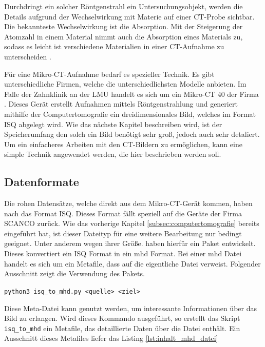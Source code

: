 Durchdringt ein solcher Röntgenstrahl ein Untersuchungsobjekt, werden die
Details aufgrund der Wechselwirkung mit Materie auf einer \ac{CT}-Probe sichtbar.
Die bekannteste Wechselwirkung ist die Absorption. Mit der Steigerung der Atomzahl
in einem Material nimmt auch die Absorption eines Materials zu, sodass es leicht
ist verschiedene Materialien in einer \ac{CT}-Aufnahme zu unterscheiden \citep[vgl.][]{nib2024}.

Für eine Mikro-\ac{CT}-Aufnahme bedarf es spezieller Technik. Es gibt
unterschiedliche Firmen, welche die unterschiedlichsten Modelle anbieten. Im
Falle der Zahnklinik an der \ac{LMU} handelt es sich um ein Mikro-\ac{CT} 40 der
Firma \citet{scanco2024}. Dieses Gerät erstellt Aufnahmen mittels
Röntgenstrahlung und generiert mithilfe der Computertomografie ein
dreidimensionales Bild, welches im Format \ac{ISQ} abgelegt wird. Wie das nächste
Kapitel beschreiben wird, ist der Speicherumfang den solch ein Bild benötigt
sehr groß, jedoch auch sehr detaliert. Um ein einfacheres Arbeiten mit den \ac{CT}-Bildern
zu ermöglichen, kann eine simple Technik angewendet werden, die hier beschrieben
werden soll.

\subsection{Datenformate}
\label{subsec:datensätze} Die rohen Datensätze, welche direkt aus dem Mikro-\ac{CT}-Gerät
kommen, haben nach \citet{scanco2024} das Format \ac{ISQ}. Dieses Format fällt speziell
auf die Geräte der Firma SCANCO zurück. Wie das vorherige Kapitel
\ref{subsec:computertomografie} bereits eingeführt hat, ist dieser Dateityp für eine
weitere Bearbeitung nur bedingt geeignet. Unter anderem wegen ihrer Größe. \citet{RoeschKunzelmann2018}
haben hierfür ein Paket entwickelt. Dieses konvertiert ein \ac{ISQ} Format in
ein \ac{mhd} Format. Bei einer \ac{mhd} Datei handelt es sich um ein Metafile,
dass auf die eigentliche Datei verweist. Folgender Ausschnitt zeigt die Verwendung
des Pakets.
\begin{center}
	\texttt{python3 isq\_to\_mhd.py <quelle> <ziel>}
\end{center}
Diese Meta-Datei kann genutzt werden, um interessante Informationen über das Bild
zu erlangen. Wird dieses Kommando ausgeführt, so erstellt das Skript \texttt{isq\_to\_mhd}
ein Metafile, das detaillierte Daten über die Datei enthält. Ein Ausschnitt
dieses Metafiles liefer das Listing \ref{lst:inhalt_mhd_datei}


